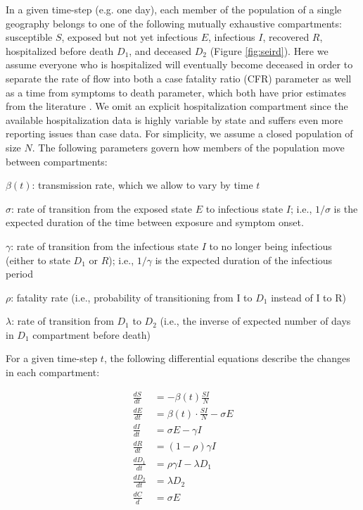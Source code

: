 \documentclass[11pt]{amsart}
\newenvironment{packed_item}{
\begin{itemize}
 \setlength{\itemsep}{0pt}
  \setlength{\parskip}{0pt}
  \setlength{\parsep}{0pt}
}{\end{itemize}}
\begin{document}
In a given time-step (e.g. one day), each member of the population of a single geography belongs to one of the following mutually exhaustive compartments:
 susceptible $S$, exposed but not yet infectious $E$, infectious $I$, recovered $R$, hospitalized before death $D_1$, and deceased $D_2$ (Figure \ref{fig:seird}). Here we assume everyone who is hospitalized will eventually become deceased in order to separate the rate of flow into both a case fatality ratio (CFR) parameter as well as a time from symptoms to death parameter, which both have prior estimates from the literature \cite{russell2020estimating}. We omit an explicit hospitalization compartment since the available hospitalization data is highly variable by state and suffers even more reporting issues than case data.  For simplicity, we assume a closed population of size $N$. 
The following parameters govern how members of the population move between compartments:  
\begin{packed_item}
\item $\beta(t)$: transmission rate, which we allow to vary by time $t$
\item $\sigma$: rate of transition from the exposed state $E$ to infectious state $I$; i.e., $1/\sigma$ is the expected duration of the time between exposure and symptom onset. 
\item $\gamma$: rate of transition from  the infectious state $I$ to no longer being infectious (either to state $D_1$ or $R$); i.e., $1/\gamma$ is the expected duration of the infectious period
\item $\rho$: fatality rate (i.e., probability of transitioning from I to $D_1$ instead of I to R)
\item $\lambda$: rate of transition from $D_1$ to $D_2$ 
(i.e., the inverse of expected number of days in $D_1$ compartment before death) 
\end{packed_item}
For a given time-step $t$, the following differential equations describe the changes in each compartment:

\begin{equation}
\begin{aligned} 
\frac{dS}{dt} &= - \beta(t) \frac{SI}{N} \\
\frac{dE}{dt} &= \beta(t) \cdot \frac{SI}{N} - \sigma E \\
\frac{dI}{dt} &= \sigma E - \gamma I\\ 
\frac{dR}{dt} &= (1-\rho)\gamma I \\
\frac{dD_1}{dt} &= \rho \gamma I - \lambda D_1\\
\frac{dD_2}{dt} &= \lambda D_2\\
\frac{dC}{d} &= \sigma E
\end{aligned}
\end{equation}
\end{document}
